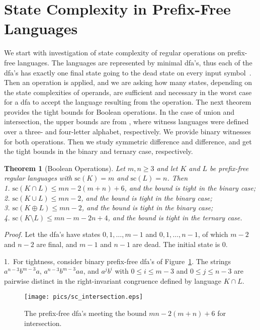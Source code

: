 \documentclass[copyright]{eptcs}
\newtheorem{theorem}{Theorem}
\renewcommand{\sc}{\mathrm{sc}}
\renewcommand{\le}{\leqslant}
\renewcommand{\ge}{\geqslant}
\begin{document}
 \section{State Complexity in Prefix-Free Languages}
 \label{***state}

 We start with investigation of
 state complexity of regular operations on prefix-free languages.
 The languages are represented by minimal dfa's,
 thus each of the dfa's has
 exactly one final state going to the dead state
 on every input symbol~\cite{hs09}.
 Then an operation is applied, and we are asking how many states,
 depending on the state complexities of operands,
 are sufficient and necessary in the worst case for a dfa
 to accept the language resulting from the operation.
 The next theorem provides the tight bounds for Boolean operations.
 In the case of union and intersection, the upper bounds are from \cite{hs09},
 where witness languages were defined 
 over a three- and four-letter alphabet, respectively.
 We provide binary witnesses for both operations.
 Then we study symmetric difference and difference,
 and get the tight bounds in the binary and ternary case, respectively.

 \begin{theorem}[Boolean Operations]\label{thm:sc_boolean}
  Let $m,n\ge 3$ and let  $K$ and $L$
  be  prefix-free regular languages  with $\sc(K)=m$ and $\sc(L)=n$.
  Then \\
  1. $\sc(K\cap L)\le mn-2(m+n)+6$, and the bound is tight in the binary case; \\
  2. $\sc(K\cup L)\le mn-2$, and the bound is tight in the binary case;\\
  3. $\sc(K\oplus L)\le mn-2$, and the bound is tight in the binary case;\\
  4. $\sc(K\setminus L)\le mn-m-2n+4$, and the bound is tight in the ternary case.
 \end{theorem}

 \noindent\emph{Proof.}
  Let the dfa's have states $0,1,\ldots,m-1$ and $0,1,\ldots,n-1$,
  of which $m-2$ and $n-2$ are final, and $m-1$ and $n-1$ are dead. 
  The initial state is 0.
  
  1.~For tightness, consider binary prefix-free 
  dfa's of Figure~\ref{fig:sc_intersection}.
  The strings
  $a^{n-3}b^{m-3}a$, $a^{n-3}b^{m-3}aa$, and $a^jb^i$ with $0\le i \le m-3$ 
  and $0 \le j \le n-3$ are pairwise distinct
  in the right-invariant congruence defined by language $K\cap L$.

  \begin{figure}[t]
  \centerline{\texttt{[image: pics/sc\_intersection.eps]}}
  \caption{The prefix-free  dfa's
           meeting the  bound $mn-2(m+n)+6$ for intersection.}
  \label{fig:sc_intersection}
  \end{figure}
\end{document}
